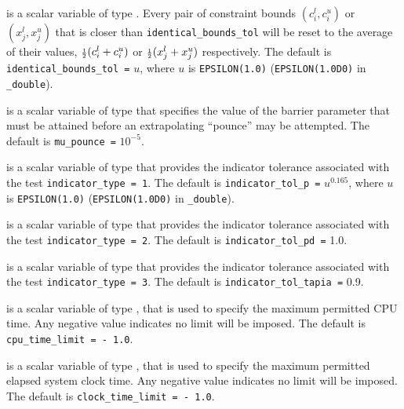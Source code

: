 \begin{description}
is a scalar variable of type \realdp.
Every pair of constraint bounds
$(c_{i}^{l}, c_{i}^{u})$ or $(x_{j}^{l}, x_{j}^{u})$
that is closer than {\tt identical\_bounds\_tol}
will be reset to the average of their values,
${\scriptstyle \frac{1}{2}} (c_{i}^{l} + c_{i}^{u})$ or ${\scriptstyle \frac{1}{2}} (x_{j}^{l} + x_{j}^{u})$
respectively.
The default is {\tt identical\_bounds\_tol =} $u$,
where $u$ is {\tt EPSILON(1.0)} ({\tt EPSILON(1.0D0)} in
{\tt \fullpackagename\_double}).

is a scalar variable of type \realdp that specifies
the value of the barrier parameter that must be attained before an 
extrapolating ``pounce'' may be attempted.
The default is {\tt mu\_pounce =} $10^{-5}$.

is a scalar variable of type \realdp that
provides the indicator tolerance associated with the test
{\tt indicator\_type = 1}.
The default is {\tt indicator\_tol\_p =} $u^{0.165}$,
where $u$ is {\tt EPSILON(1.0)} ({\tt EPSILON(1.0D0)} in
{\tt \fullpackagename\_double}).

is a scalar variable of type \realdp that
provides the indicator tolerance associated with the test
{\tt indicator\_type = 2}.
The default is {\tt indicator\_tol\_pd =} 1.0.

is a scalar variable of type \realdp that
provides the indicator tolerance associated with the test
{\tt indicator\_type = 3}.
The default is {\tt indicator\_tol\-\_tapia =} 0.9.

 is a scalar variable of type \realdp,
that is used to specify the maximum permitted CPU time. Any negative
value indicates no limit will be imposed. The default is
{\tt cpu\_time\_limit = - 1.0}.

 is a scalar variable of type \realdp,
that is used to specify the maximum permitted elapsed system clock time.
Any negative value indicates no limit will be imposed. The default is
{\tt clock\_time\_limit = - 1.0}.



\end{description}
